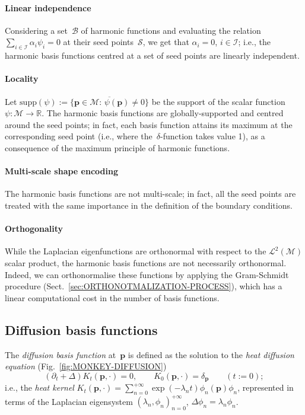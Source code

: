 \documentclass[acmtog,authorversion]{acmart}
\begin{document}
\paragraph{Linear independence} 
Considering a set~$\mathcal{B}$ of harmonic functions and evaluating the relation \mbox{$\sum_{i\in\mathcal{I}}\alpha_{i}\psi_{i}=0$} at their seed points~$\mathcal{S}$, we get that \mbox{$\alpha_{i}=0$}, \mbox{$i\in\mathcal{I}$}; i.e., the harmonic basis functions centred at a set of seed points are linearly independent. 

\paragraph*{Locality}
Let \mbox{$\textrm{supp}(\psi):=\overline{\{\mathbf{p}\in\mathcal{M}:\,\psi(\mathbf{p})\neq 0\}}$} be the support of the scalar function \mbox{$\psi:\mathcal{M}\rightarrow\mathbb{R}$}. The harmonic basis functions are globally-supported and centred around the seed points; in fact, each basis function attains its maximum at the corresponding seed point (i.e., where the~$\delta$-function takes value 1), as a consequence of the maximum principle of harmonic functions.

\paragraph*{Multi-scale shape encoding}
The harmonic basis functions are not multi-scale; in fact, all the seed points are treated with the same importance in the definition of the boundary conditions.

\paragraph*{Orthogonality}
While the Laplacian eigenfunctions are orthonormal with respect to the \mbox{$\mathcal{L}^{2}(\mathcal{M})$} scalar product, the harmonic basis functions are not necessarily orthonormal. Indeed, we can orthonormalise these functions by applying the Gram-Schmidt procedure (Sect.~\ref{sec:ORTHONOTMALIZATION-PROCESS}), which has a linear computational cost in the number of basis functions. 

\subsection{Diffusion basis functions\label{sec:DIFFUSION-BASIS}}
The \emph{diffusion basis function} at~$\mathbf{p}$ is defined as the solution to the \emph{heat diffusion equation} (Fig.~\ref{fig:MONKEY-DIFFUSION})
%
\begin{equation*}
(\partial_{t}+\Delta) K_{t}(\mathbf{p},\cdot)=0,\qquad
K_{0}(\mathbf{p},\cdot)=\delta_{\mathbf{p}}\qquad (t:=0);
\end{equation*}
%
i.e., the \emph{heat kernel} \mbox{$K_{t}(\mathbf{p},\cdot)
=\sum_{n=0}^{+\infty}\exp(-\lambda_{n}t)\phi_{n}(\mathbf{p})\phi_{n}$}, represented in terms of the Laplacian eigensystem \mbox{$(\lambda_{n},\phi_{n})_{n=0}^{+\infty}$}, \mbox{$\Delta\phi_{n}=\lambda_{n}\phi_{n}$}.
\end{document}

